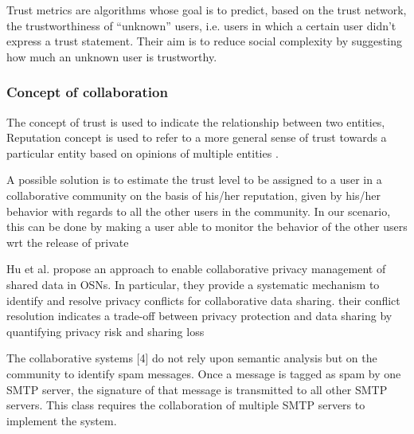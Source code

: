 Trust metrics are algorithms whose goal is to predict,
	based on the trust network,
	the trustworthiness of “unknown” users,
	i.e. users in which a certain user didn’t express a trust statement.
Their aim is to reduce social complexity by suggesting how much an unknown user is trustworthy.

\subsubsection{Concept of collaboration}


The concept of trust is used to indicate the relationship between two entities,
Reputation concept is used to refer to a more general sense of trust towards a particular entity based on opinions of multiple entities \cite{cho_survey_2015, hussain_overview_2007}.

A possible solution is to estimate the trust level to be assigned to a user in a collaborative community on the basis of his/her reputation,
	given by his/her behavior with regards to all the other users in the community.
In our scenario,
	this can be done by making a user able to monitor the behavior of the other users wrt the release of private

Hu et al. \cite{hu_detecting_2011} propose an approach to enable collaborative privacy management of shared data in OSNs.
In particular,
	they provide a systematic mechanism to identify and resolve privacy conflicts for collaborative data sharing.
their conflict resolution indicates a trade-off between privacy protection and data sharing by quantifying privacy risk and sharing loss

The collaborative systems [4] do not rely upon semantic analysis but on the community to identify spam messages.
Once a message is tagged as spam by one SMTP server,
	the signature of that message is transmitted to all other SMTP servers.
This class requires the collaboration of multiple SMTP servers to implement the system.



